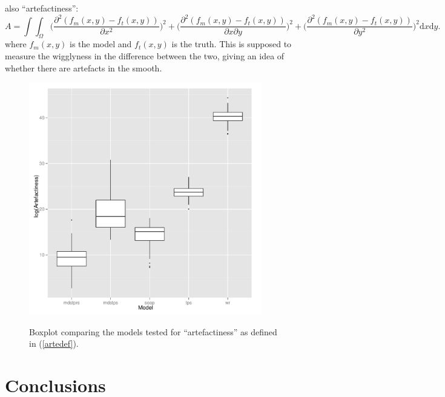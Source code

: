\documentclass[10pt]{article}
\begin{document}
also ``artefactiness'':
\begin{equation}
\label{artedef}
A= \int\int_\Omega  \Big( \frac{\partial^2 (f_m(x,y)-f_t(x,y))}{\partial x^2}\Big)^2 + \Big(\frac{\partial^2 (f_m(x,y)-f_t(x,y))}{\partial x \partial y}\Big)^2 + \Big(\frac{\partial^2 (f_m(x,y)-f_t(x,y))}{\partial y^2}\Big)^2 \text{d}x\text{d}y.
\end{equation}
where $f_m(x,y)$ is the model and  $f_t(x,y)$ is the truth. This is supposed to measure the wigglyness in the difference between the two, giving an idea of whether there are artefacts in the smooth.

\begin{figure}
\centering
\includegraphics[width=4in]{figs/arteboxplot.pdf}\\
\caption{Boxplot comparing the models tested for ``artefactiness'' as defined in (\ref{artedef}).}
\label{arteboxplot}
\end{figure}



\section{Conclusions}





\end{document}
